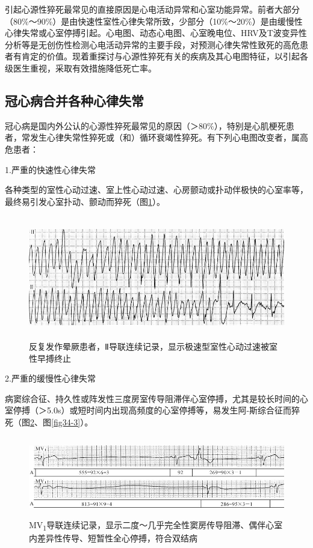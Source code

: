 引起心源性猝死最常见的直接原因是心电活动异常和心室功能异常。前者大部分（80\%～90\%）是由快速性室性心律失常所致，少部分（10\%～20\%）是由缓慢性心律失常或心室停搏引起。心电图、动态心电图、心室晚电位、HRV及T波变异性分析等是无创伤性检测心电活动异常的主要手段，对预测心律失常性致死的高危患者有肯定的价值。现着重探讨与心源性猝死有关的疾病及其心电图特征，以引起各级医生重视，采取有效措施降低死亡率。

\protect\hypertarget{text00041.htmlux5cux23subid449}{}{}

\subsection{冠心病合并各种心律失常}

冠心病是国内外公认的心源性猝死最常见的原因（＞80\%），特别是心肌梗死患者，常发生心律失常性猝死或（和）循环衰竭性猝死。有下列心电图改变者，属高危患者：

1.严重的快速性心律失常

各种类型的室性心动过速、室上性心动过速、心房颤动或扑动伴极快的心室率等，最终易引发心室扑动、颤动而猝死（图\ref{fig34-1}）。

\begin{figure}[!htbp]
 \centering
 \includegraphics[width=5.58333in,height=2.11458in]{./images/Image00541.jpg}
 \captionsetup{justification=centering}
 \caption{反复发作晕厥患者，Ⅱ导联连续记录，显示极速型室性心动过速被室性早搏终止}
 \label{fig34-1}
  \end{figure} 

2.严重的缓慢性心律失常

病窦综合征、持久性或阵发性三度房室传导阻滞伴心室停搏，尤其是较长时间的心室停搏（＞5.0s）或短时间内出现高频度的心室停搏等，易发生阿-斯综合征而猝死（图\ref{fig34-2}、图\ref{fig34-3}）。

\begin{figure}[!htbp]
 \centering
 \includegraphics[width=5.69792in,height=1.38542in]{./images/Image00542.jpg}
 \captionsetup{justification=centering}
 \caption{MV\textsubscript{1}导联连续记录，显示二度～几乎完全性窦房传导阻滞、偶伴心室内差异性传导、短暂性全心停搏，符合双结病}
 \label{fig34-2}
  \end{figure} 


